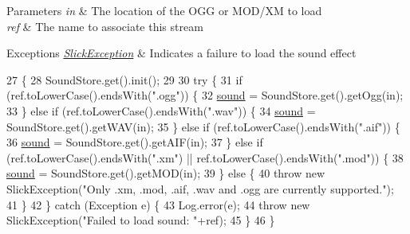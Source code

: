 \begin{DoxyParams}{Parameters}
{\em in} & The location of the O\+GG or M\+O\+D/\+XM to load \\
\hline
{\em ref} & The name to associate this stream \\
\hline
\end{DoxyParams}

\begin{DoxyExceptions}{Exceptions}
{\em \mbox{\hyperlink{classorg_1_1newdawn_1_1slick_1_1_slick_exception}{Slick\+Exception}}} & Indicates a failure to load the sound effect \\
\hline
\end{DoxyExceptions}

\begin{DoxyCode}
27                                                                    \{
28         SoundStore.get().init();
29         
30         \textcolor{keywordflow}{try} \{
31             \textcolor{keywordflow}{if} (ref.toLowerCase().endsWith(\textcolor{stringliteral}{".ogg"})) \{
32                 \mbox{\hyperlink{classorg_1_1newdawn_1_1slick_1_1_sound_aefd4460784b86c7003356f59cafe3dc8}{sound}} = SoundStore.get().getOgg(in);
33             \} \textcolor{keywordflow}{else} \textcolor{keywordflow}{if} (ref.toLowerCase().endsWith(\textcolor{stringliteral}{".wav"})) \{
34                 \mbox{\hyperlink{classorg_1_1newdawn_1_1slick_1_1_sound_aefd4460784b86c7003356f59cafe3dc8}{sound}} = SoundStore.get().getWAV(in);
35             \} \textcolor{keywordflow}{else} \textcolor{keywordflow}{if} (ref.toLowerCase().endsWith(\textcolor{stringliteral}{".aif"})) \{
36                 \mbox{\hyperlink{classorg_1_1newdawn_1_1slick_1_1_sound_aefd4460784b86c7003356f59cafe3dc8}{sound}} = SoundStore.get().getAIF(in);
37             \} \textcolor{keywordflow}{else} \textcolor{keywordflow}{if} (ref.toLowerCase().endsWith(\textcolor{stringliteral}{".xm"}) || ref.toLowerCase().endsWith(\textcolor{stringliteral}{".mod"})) \{
38                 \mbox{\hyperlink{classorg_1_1newdawn_1_1slick_1_1_sound_aefd4460784b86c7003356f59cafe3dc8}{sound}} = SoundStore.get().getMOD(in);
39             \} \textcolor{keywordflow}{else} \{
40                 \textcolor{keywordflow}{throw} \textcolor{keyword}{new} SlickException(\textcolor{stringliteral}{"Only .xm, .mod, .aif, .wav and .ogg are currently supported."});
41             \}
42         \} \textcolor{keywordflow}{catch} (Exception e) \{
43             Log.error(e);
44             \textcolor{keywordflow}{throw} \textcolor{keyword}{new} SlickException(\textcolor{stringliteral}{"Failed to load sound: "}+ref);
45         \}
46     \}
\end{DoxyCode}
\mbox{\label{classorg_1_1newdawn_1_1slick_1_1_sound_a20dcf700d3465e252a2bdfba4027f9f4}} 
